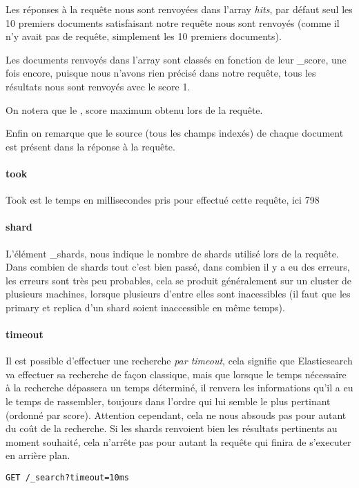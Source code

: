Les réponses à la requête nous sont renvoyées dans l'array \textit{hits}, par défaut
seul les 10 premiers documents satisfaisant notre requête nous sont renvoyés 
(comme il n'y avait pas de requête, simplement les 10 premiers documents).

Les documents renvoyés dans l'array sont classés en fonction de leur \_score, une 
fois encore, puisque nous n'avons rien précisé dans notre requête, tous les résultats 
nous sont renvoyés avec le score 1.

On notera que le , score maximum obtenu lors de la requête.

Enfin on remarque que le source (tous les champs indexés) de chaque document est présent
dans la réponse à la requête.

\paragraph{took}
Took est le temps en millisecondes pris pour effectué cette requête, ici 798

\paragraph{shard}
L'élément \_shards, nous indique le nombre de shards utilisé lors de la requête. 
Dans combien de shards tout c'est bien passé, dans combien il y a eu des erreurs,
les erreurs sont très peu probables, cela se produit généralement sur un cluster 
de plusieurs machines, lorsque plusieurs d'entre elles sont inacessibles (il faut 
que les primary et replica d'un shard soient inaccessible en même temps).

\paragraph{timeout}
Il est possible d'effectuer une recherche \textit{par timeout}, cela signifie que 
Elasticsearch va effectuer sa recherche de façon classique, mais que lorsque le temps
nécessaire à la recherche dépassera un temps déterminé, il renvera les informations 
qu'il a eu le temps de rassembler, toujours dans l'ordre qui lui semble le plus pertinant
(ordonné par score). Attention cependant, cela ne nous absouds pas pour autant du
coût de la recherche. Si les shards renvoient bien les résultats pertinents au moment
souhaité, cela n'arrête pas pour autant la requête qui finira de s'executer en arrière
plan.

\begin{lstlisting}[style=code,label={lst:APIsearchemptyexample3},caption={Une recherche "vide" avec timeout}]
GET /_search?timeout=10ms
\end{lstlisting}


